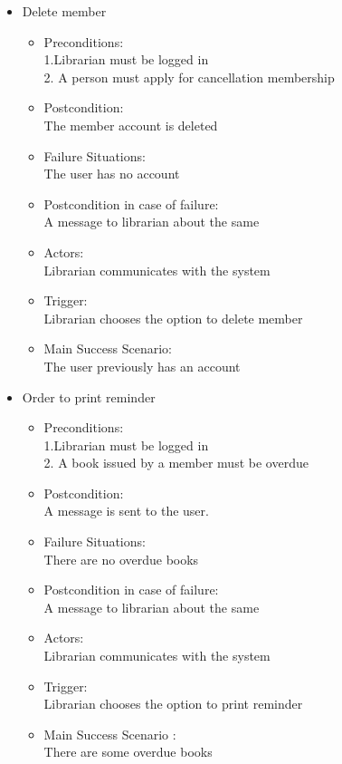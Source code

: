 \documentclass[a4paper]{article}
\begin{document}
\begin{enumerate}
\begin{itemize}
\item Delete member\\ 
 \begin{itemize}
  \item Preconditions:\\ 1.Librarian must be logged in\\ 2. A person must apply for cancellation membership\\ 
 \item Postcondition:\\ The member account is deleted\\ 
 \item Failure Situations: \\ The user has no account\\ 
 \item Postcondition in case of failure:\\ A message to librarian about the same\\ 
 \item Actors: \\ Librarian communicates with the system\\ 
 \item Trigger:\\  Librarian  chooses the option to delete member\\ 
 \item Main Success Scenario:\\  The user   previously has an account\\ 
 \end{itemize}
 
 \item Order to print reminder\\ 
 \begin{itemize}
  \item Preconditions:\\ 1.Librarian must be logged in\\ 2. A book issued by a member must be overdue\\ 
 \item Postcondition:\\ A message is sent to the user.\\ 
 \item Failure Situations:\\  There are no overdue books\\ 
 \item Postcondition in case of failure:\\ A message to librarian about the same\\ 
 \item Actors: \\ Librarian communicates with the system\\ 
 \item Trigger:\\  Librarian  chooses the option to print reminder\\ 
 \item Main Success Scenario :\\  There are some overdue books\\ 
 \end{itemize}


\end{itemize}
\end{enumerate}
\end{document}
